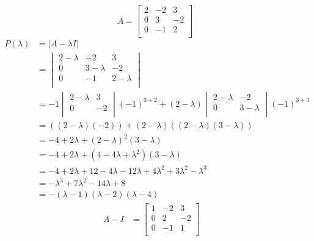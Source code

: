 \documentclass{article}
\begin{document}
\begin{itemize}
    \begin{equation*}
        A =
        \begin{bmatrix}
            2 & -2 & 3\\
            0 & 3 & -2\\
            0 & -1 & 2\\
        \end{bmatrix}
    \end{equation*}
    \begin{align*}
        P(\lambda) &= |A-\lambda I|\\
        &=
        \begin{vmatrix}
            2-\lambda & -2 & 3\\
            0 & 3-\lambda & -2\\
            0 & -1 & 2-\lambda\\
        \end{vmatrix}\\
        &= -1
        \begin{vmatrix}
            2-\lambda & 3\\
            0 & -2\\
        \end{vmatrix}
        (-1)^{3+2} + (2-\lambda)
        \begin{vmatrix}
            2-\lambda & -2\\
            0 & 3-\lambda\\
        \end{vmatrix}
        (-1)^{3+3}\\
        &= ((2-\lambda)(-2))+(2-\lambda)((2-\lambda)(3-\lambda))\\
        &= -4+2\lambda+(2-\lambda)^2(3-\lambda)\\
        &= -4+2\lambda+(4-4\lambda+\lambda^2)(3-\lambda)\\
        &= -4+2\lambda+12-4\lambda-12\lambda+4\lambda^2+3\lambda^2-\lambda^3\\
        &= -\lambda^3+7\lambda^2-14\lambda+8\\
        &= -(\lambda-1)(\lambda-2)(\lambda-4)
    \end{align*}
    \begin{align*}
        A-I &=
        \begin{bmatrix}
            1 & -2 & 3\\
            0 & 2 & -2\\
            0 & -1 & 1\\
        \end{bmatrix}&

\end{align*}
\end{itemize}
\end{document}
